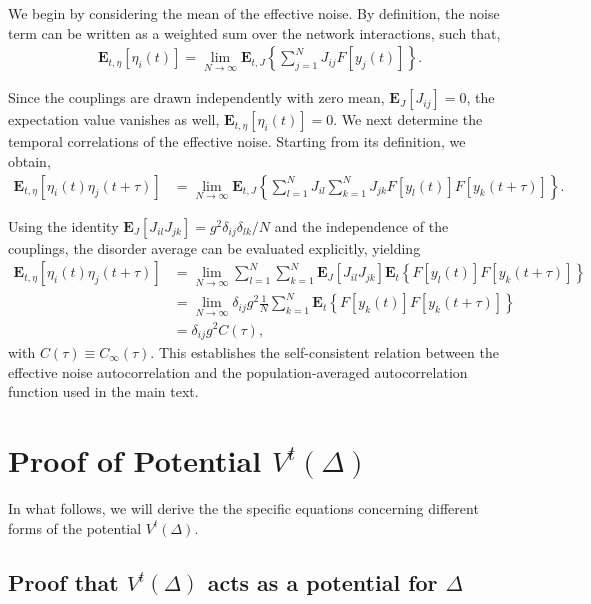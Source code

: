 \documentclass[reprint,amsmath,amssymb,aps]{revtex4-2}
\begin{document}
We begin by considering the mean of the effective noise. By definition, the noise term can be written as a weighted sum over the network interactions, such that,
\begin{align*}
   \mathbf{E}_{t,\eta} \left[\eta_i(t)\right]
   =
   \lim_{N\to\infty}
   \mathbf{E}_{t,J} \left\{
   \sum_{j=1}^N J_{ij} F[y_j(t)]
   \right\}.
\end{align*}

Since the couplings are drawn independently with zero mean, $\mathbf{E}_{J} \left[J_{ij}\right]=0$, the expectation value vanishes as well, $\mathbf{E}_{t,\eta} \left[\eta_i(t)\right] = 0$. We next determine the temporal correlations of the effective noise. Starting from its definition, we obtain,
\begin{align*}
    \mathbf{E}_{t,\eta} \left[\eta_i(t) \eta_j(t+\tau)\right]
    &=
    \lim_{N\to\infty}
    \mathbf{E}_{t,J} \left\{
    \sum_{l=1}^N J_{il}
    \sum_{k=1}^N J_{jk}
    F[y_l(t)] F[y_k(t+\tau)]
    \right\}.
\end{align*}

Using the identity $\mathbf{E}_{J} \left[J_{il}J_{jk}\right]=g^2 \delta_{ij}\delta_{lk}/N$ and the independence of the couplings, the disorder average can be evaluated explicitly, yielding
\begin{align*}
    \mathbf{E}_{t,\eta} \left[\eta_i(t) \eta_j(t+\tau)\right]
    &=
    \lim_{N\to\infty} \sum_{l=1}^N \sum_{k=1}^N \mathbf{E}_{J} \left[  J_{il} J_{jk} \right] \mathbf{E}_{t} \left\{ F[y_l(t)] F[y_k(t+\tau)]\right\}
    \\
    &=
    \lim_{N\to\infty} 
    \delta_{ij} g^2 \frac{1}{N}\sum_{k=1}^N \mathbf{E}_{t} \left\{ F[y_k(t)] F[y_k(t+\tau)]\right\}\\
    &=
    \delta_{ij} g^2 C(\tau),
\end{align*}
with $ C(\tau) \equiv C_\infty(\tau) $. This establishes the self-consistent relation between the effective noise autocorrelation and the population-averaged autocorrelation function used in the main text.

\section{Proof of Potential $V^t(\Delta)$}
\label{app:proof_potential}
 In what follows, we will derive the the specific equations concerning different forms of the potential $V^t(\Delta)$.
 
 
\subsection{Proof that $V^t(\Delta)$ acts as a potential for $\Delta$}
\label{app:proof_potential}
\end{document}

